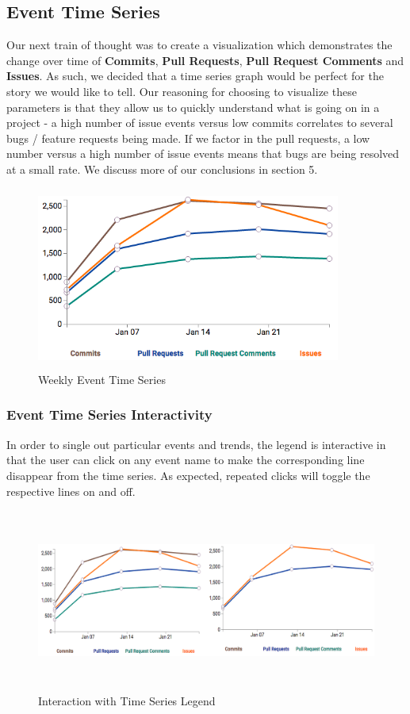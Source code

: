 \documentclass{article}
\begin{document}
\subsection {Event Time Series}

Our next train of thought was to create a visualization which demonstrates the change over time of \textbf{Commits}, \textbf{Pull Requests}, \textbf{Pull Request Comments} and \textbf{Issues}. As such, we decided that a time series graph would be perfect for the story we would like to tell. Our reasoning for choosing to visualize these parameters is that they allow us to quickly understand what is going on in a project - a high number of issue events versus low commits correlates to several bugs / feature requests being made. If we factor in the pull requests, a low number versus a high number of issue events means that bugs are being resolved at a small rate. We discuss more of our conclusions in section 5.

\begin{figure}[h!]
\centering
\includegraphics[height=6cm, width=10cm]{time}
\caption{Weekly Event Time Series}
\end{figure}

\subsubsection {Event Time Series Interactivity}

In order to single out particular events and trends, the legend is interactive in that the user can click on any event name to make the corresponding line disappear from the time series. As expected, repeated clicks will toggle the respective lines on and off.

\begin{figure}[h!]
\centering
\includegraphics[height=6cm, width=16cm]{combined}
\caption{Interaction with Time Series Legend}
\end{figure}
\end{document}

